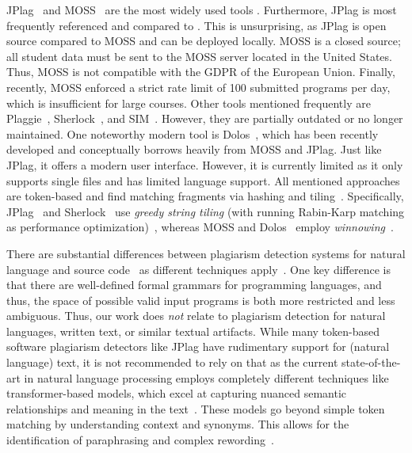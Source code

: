 JPlag~\cite{prechelt2000} and MOSS~\cite{MOSS} are the most widely used tools \cite{Aniceto2021, Novak2019}.
Furthermore, JPlag is most frequently referenced and compared to \cite{Novak2019}. This is unsurprising, as JPlag is open source compared to MOSS and can be deployed locally. MOSS is a closed source; all student data must be sent to the MOSS server located in the United States. Thus, MOSS is not compatible with the \ac{GDPR} of the European Union. Finally, recently, MOSS enforced a strict rate limit of 100 submitted programs per day, which is insufficient for large courses.
Other tools mentioned frequently are Plaggie~\cite{Plaggie}, Sherlock~\cite{Joy1999}, and SIM~\cite{SIM}. However, they are partially outdated or no longer maintained.
One noteworthy modern tool is Dolos~\cite{Maertens2022}, which has been recently developed and conceptually borrows heavily from MOSS and JPlag.
Just like JPlag, it offers a modern user interface.
However, it is currently limited as it only supports single files and has limited language support.
All mentioned approaches are token-based and find matching fragments via hashing and tiling~\cite{prechelt2002, MOSS}. Specifically, JPlag~\cite{prechelt2000, prechelt2002} and Sherlock~\cite{Joy1999} use \textit{greedy string tiling} (with running Rabin-Karp matching as performance optimization)~\cite{Wise1993, Wise1995}, whereas MOSS and Dolos~\cite{Maertens2022} employ \textit{winnowing}~\cite{Schleimer2003}.

There are substantial differences between plagiarism detection systems for natural language and source code~\cite{Fincher2019, Simon2013, Simon2014b} as different techniques apply~\cite{Lancaster2005}. One key difference is that there are well-defined formal grammars for programming languages, and thus, the space of possible valid input programs is both more restricted and less ambiguous.
Thus, our work does \textit{not} relate to plagiarism detection for natural languages, written text, or similar textual artifacts. While many token-based software plagiarism detectors like JPlag have rudimentary support for (natural language) text, it is not recommended to rely on that as the current state-of-the-art in natural language processing employs completely different techniques like transformer-based models, which excel at capturing nuanced semantic relationships and meaning in the text~\cite{khurana2023, min2023}. These models go beyond simple token matching by understanding context and synonyms. This allows for the identification of paraphrasing and complex rewording~\cite{foltynek2019, manzoor2023}.

